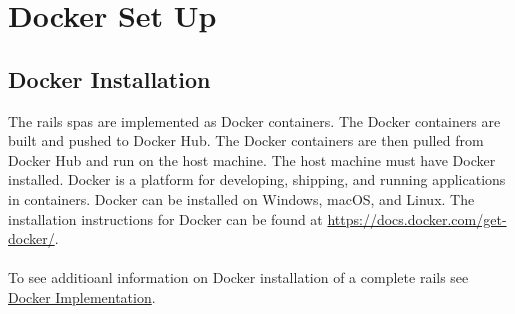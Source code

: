 \chapter{Docker Set Up}

\section{Docker Installation}
\label{sec:dockerinstall}
The \gls{rails} \glspl{spa} are implemented as Docker containers. The Docker containers are built and pushed to Docker Hub. The Docker containers are then pulled from Docker Hub and run on the host machine. 
The host machine must have Docker installed. Docker is a platform for developing, shipping, and running applications in containers. Docker can be installed on Windows, macOS, and Linux. 
The installation instructions for Docker can be found at \href{https://docs.docker.com/get-docker/}{https://docs.docker.com/get-docker/}.\\
\\
To see additioanl information on Docker installation of a complete \gls{rails} see \href{https://github.com/djbristow/RAILS/blob/master/Documentation/rails-docker.pdf}{Docker Implementation}.\\
